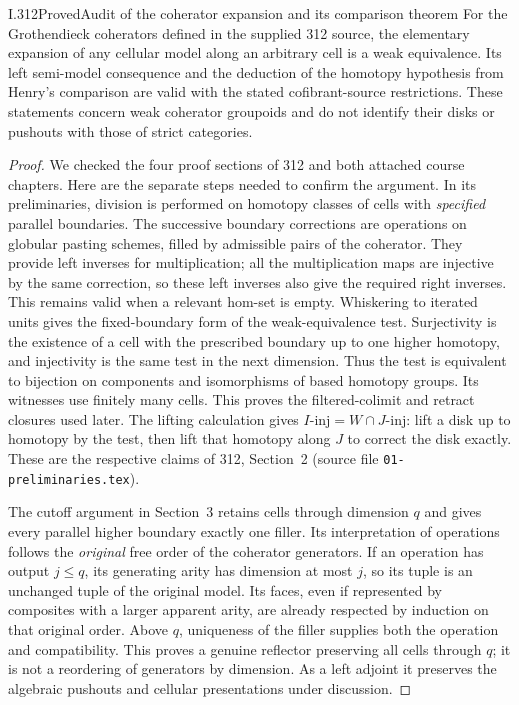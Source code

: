 \begin{claim}{I.312}{Proved}{Audit of the coherator expansion and its comparison theorem}
For the Grothendieck coherators defined in the supplied 312 source,
the elementary expansion of any cellular model along an arbitrary
cell is a weak equivalence. Its left semi-model consequence and
the deduction of the homotopy hypothesis from Henry's comparison
are valid with the stated cofibrant-source restrictions. These
statements concern weak coherator groupoids and do not identify
their disks or pushouts with those of strict categories.
\end{claim}
\begin{proof}
We checked the four proof sections of 312 and both attached course
chapters. Here are the separate steps needed to confirm the
argument. In its preliminaries, division is performed on homotopy
classes of cells with \emph{specified} parallel boundaries. The
successive boundary corrections are operations on globular pasting
schemes, filled by admissible pairs of the coherator. They provide
left inverses for multiplication; all the multiplication maps are
injective by the same correction, so these left inverses also give
the required right inverses. This remains valid when a relevant
hom-set is empty. Whiskering to iterated units gives the
fixed-boundary form of the weak-equivalence test. Surjectivity is
the existence of a cell with the prescribed boundary up to one
higher homotopy, and injectivity is the same test in the next
dimension. Thus the test is equivalent to bijection on components
and isomorphisms of based homotopy groups. Its witnesses use
finitely many cells. This proves the filtered-colimit and retract
closures used later. The lifting calculation gives
$I\text{-}\mathrm{inj}=W\cap J\text{-}\mathrm{inj}$: lift a disk
up to homotopy by the test, then lift that homotopy along $J$ to
correct the disk exactly. These are the respective claims of
312, Section~2 (source file \texttt{01-preliminaries.tex}).

The cutoff argument in Section~3 retains cells through dimension
$q$ and gives every parallel higher boundary exactly one filler.
Its interpretation of operations follows the \emph{original}
free order of the coherator generators. If an operation has output
$j\leq q$, its generating arity has dimension at most $j$, so
its tuple is an unchanged tuple of the original model. Its faces,
even if represented by composites with a larger apparent arity,
are already respected by induction on that original order. Above
$q$, uniqueness of the filler supplies both the operation and
compatibility. This proves a genuine reflector preserving all
cells through $q$; it is not a reordering of generators by
dimension. As a left adjoint it preserves the algebraic pushouts
and cellular presentations under discussion.


\end{proof}
